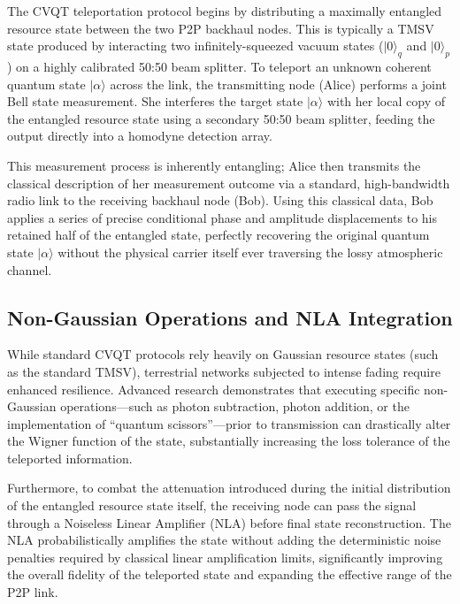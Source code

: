 \documentclass[11pt,a4paper]{article}
\begin{document}
The CVQT teleportation protocol begins by distributing a maximally entangled resource state between the two P2P backhaul nodes.\cite{ref54} This is typically a TMSV state produced by interacting two infinitely-squeezed vacuum states ($\lvert 0\rangle_q$ and $\lvert 0\rangle_p$) on a highly calibrated 50:50 beam splitter.\cite{ref54} To teleport an unknown coherent quantum state $\lvert\alpha\rangle$ across the link, the transmitting node (Alice) performs a joint Bell state measurement.\cite{ref54} She interferes the target state $\lvert\alpha\rangle$ with her local copy of the entangled resource state using a secondary 50:50 beam splitter, feeding the output directly into a homodyne detection array.\cite{ref54}

This measurement process is inherently entangling; Alice then transmits the classical description of her measurement outcome via a standard, high-bandwidth radio link to the receiving backhaul node (Bob).\cite{ref54} Using this classical data, Bob applies a series of precise conditional phase and amplitude displacements to his retained half of the entangled state, perfectly recovering the original quantum state $\lvert\alpha\rangle$ without the physical carrier itself ever traversing the lossy atmospheric channel.\cite{ref54}

\subsection{Non-Gaussian Operations and NLA Integration}

While standard CVQT protocols rely heavily on Gaussian resource states (such as the standard TMSV), terrestrial networks subjected to intense fading require enhanced resilience. Advanced research demonstrates that executing specific non-Gaussian operations---such as photon subtraction, photon addition, or the implementation of ``quantum scissors''---prior to transmission can drastically alter the Wigner function of the state, substantially increasing the loss tolerance of the teleported information.\cite{ref51}

Furthermore, to combat the attenuation introduced during the initial distribution of the entangled resource state itself, the receiving node can pass the signal through a Noiseless Linear Amplifier (NLA) before final state reconstruction.\cite{ref52} The NLA probabilistically amplifies the state without adding the deterministic noise penalties required by classical linear amplification limits, significantly improving the overall fidelity of the teleported state and expanding the effective range of the P2P link.\cite{ref52}
\end{document}
